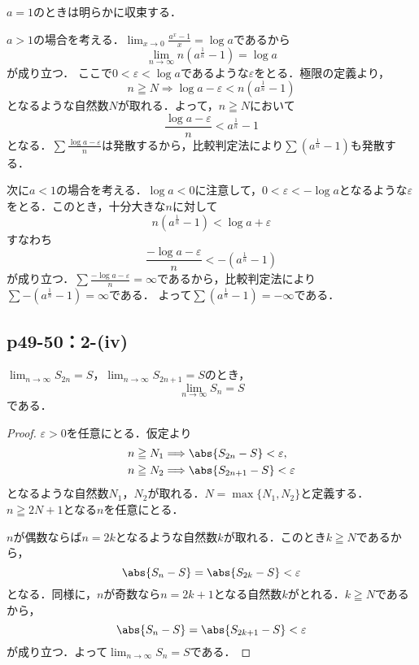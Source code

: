 \documentclass[a4paper,10pt,fleqn]{ltjsarticle}
\begin{document}
	\begin{screen}
        $a=1$のときは明らかに収束する．
  
        $a>1$の場合を考える．$\lim_{x \to 0} \frac{a^x-1}{x} = \log a$であるから
        \[
        \lim_{n \to \infty} n(a^{\frac{1}{n}}-1) = \log a
        \]
        が成り立つ．
        ここで$0 < \varepsilon <\log a$であるような$\varepsilon$をとる．極限の定義より，
        \[
         n \geqq N \Longrightarrow \log a - \varepsilon < n (a^\frac{1}{n}-1)
        \]
        となるような自然数$N$が取れる．よって，$n \geqq N$において
        \[
            \frac{\log a - \varepsilon}{n} < a^\frac{1}{n}-1
        \]
        となる．$\sum \frac{\log a - \varepsilon}{n}$は発散するから，比較判定法により$\sum (a^{\frac{1}{n}}-1)$も発散する．

        次に$ a<1$の場合を考える．$\log a <0$に注意して，$0 < \varepsilon <-\log a $となるような$\varepsilon$をとる．このとき，十分大きな$n$に対して
        \[
        n (a^\frac{1}{n}-1) < \log a + \varepsilon
        \]
        すなわち
        \[
        \frac{-\log a - \varepsilon}{n} < -(a^\frac{1}{n}-1)
        \]
        が成り立つ．$\sum \frac{-\log a - \varepsilon}{n}=\infty$であるから，比較判定法により$\sum -(a^{\frac{1}{n}}-1)=\infty$である．
        よって$\sum (a^{\frac{1}{n}}-1)=-\infty$である．
	\end{screen}


    \subsection*{p49-50：2-(iv)}


    $\lim_{n \to \infty} S_{2n}=S$，$\lim_{n \to \infty} S_{2n+1}=S$のとき，
    \[
    \lim_{n \to \infty} S_n = S
    \]
    である．

    \begin{proof}
    $\varepsilon >0$を任意にとる．仮定より
    \begin{align*} 
       &  n \geqq N_1 \Longrightarrow \abs{S_{2n}-S} < \varepsilon, \\
       & n \geqq N_2 \Longrightarrow \abs{S_{2n+1}-S} < \varepsilon
    \end{align*}
    となるような自然数$N_1$，$N_2$が取れる．$N=\max\{N_1, N_2\}$と定義する．$n \geqq 2N +1$となる$n$を任意にとる．

    $n$が偶数ならば$n =2k$となるような自然数$k$が取れる．このとき$k \geqq N$であるから，
    \[
    \abs{S_n -S}=\abs{S_{2k}-S}<\varepsilon 
    \]
    となる．同様に，$n$が奇数なら$n =2k+1$となる自然数$k$がとれる．$k \geqq N$であるから，
    \[
    \abs{S_n -S}=\abs{S_{2k+1}-S}<\varepsilon 
    \]
    が成り立つ．よって$\lim_{n \to \infty} S_n =S$である．
    \end{proof}
\end{document}
